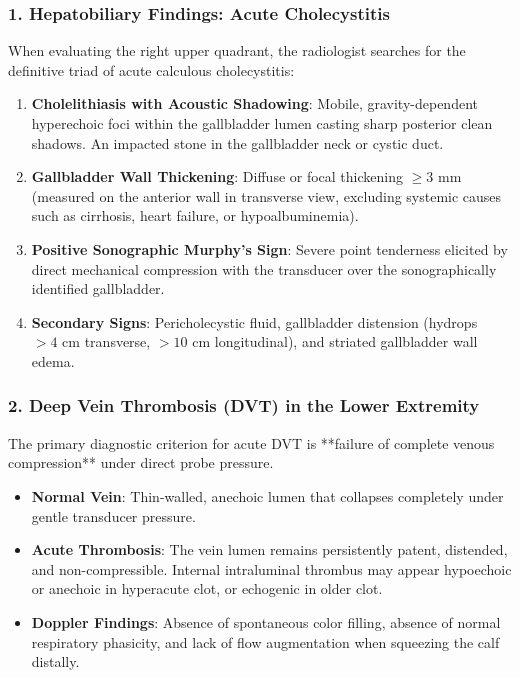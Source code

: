 \documentclass[11pt,a4paper]{article}
\begin{document}
\subsubsection{1. Hepatobiliary Findings: Acute Cholecystitis}
When evaluating the right upper quadrant, the radiologist searches for the definitive triad of acute calculous cholecystitis:
\begin{enumerate}
    \item \textbf{Cholelithiasis with Acoustic Shadowing}: Mobile, gravity-dependent hyperechoic foci within the gallbladder lumen casting sharp posterior clean shadows. An impacted stone in the gallbladder neck or cystic duct.
    \item \textbf{Gallbladder Wall Thickening}: Diffuse or focal thickening $\ge 3\text{ mm}$ (measured on the anterior wall in transverse view, excluding systemic causes such as cirrhosis, heart failure, or hypoalbuminemia).
    \item \textbf{Positive Sonographic Murphy's Sign}: Severe point tenderness elicited by direct mechanical compression with the transducer over the sonographically identified gallbladder.
    \item \textbf{Secondary Signs}: Pericholecystic fluid, gallbladder distension (hydrops $>4\text{ cm}$ transverse, $>10\text{ cm}$ longitudinal), and striated gallbladder wall edema.
\end{enumerate}

\subsubsection{2. Deep Vein Thrombosis (DVT) in the Lower Extremity}
The primary diagnostic criterion for acute DVT is **failure of complete venous compression** under direct probe pressure.
\begin{itemize}
    \item \textbf{Normal Vein}: Thin-walled, anechoic lumen that collapses completely under gentle transducer pressure.
    \item \textbf{Acute Thrombosis}: The vein lumen remains persistently patent, distended, and non-compressible. Internal intraluminal thrombus may appear hypoechoic or anechoic in hyperacute clot, or echogenic in older clot.
    \item \textbf{Doppler Findings}: Absence of spontaneous color filling, absence of normal respiratory phasicity, and lack of flow augmentation when squeezing the calf distally.
\end{itemize}
\end{document}
